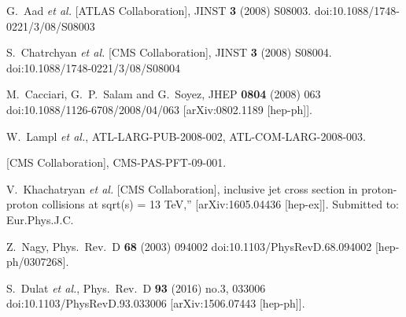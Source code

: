 \documentclass{PoS}
\begin{document}
\begin{thebibliography}{99}

  G.~Aad {\it et al.} [ATLAS Collaboration],
  JINST {\bf 3} (2008) S08003.
  doi:10.1088/1748-0221/3/08/S08003

  S.~Chatrchyan {\it et al.} [CMS Collaboration],
  JINST {\bf 3} (2008) S08004.
  doi:10.1088/1748-0221/3/08/S08004

  M.~Cacciari, G.~P.~Salam and G.~Soyez,
  JHEP {\bf 0804} (2008) 063
  doi:10.1088/1126-6708/2008/04/063
  [arXiv:0802.1189 [hep-ph]].

 W.~Lampl {\it et al.}, %
ATL-LARG-PUB-2008-002, ATL-COM-LARG-2008-003.

  [CMS Collaboration],
  CMS-PAS-PFT-09-001.

 V.~Khachatryan {\it et al.} [CMS Collaboration], %
inclusive jet cross section in proton-proton collisions at sqrt(s) = 13 TeV,'' [arXiv:1605.04436 [hep-ex]]. Submitted
to: Eur.Phys.J.C.

  Z.~Nagy,
  Phys.\ Rev.\ D {\bf 68} (2003) 094002
  doi:10.1103/PhysRevD.68.094002
  [hep-ph/0307268].

  S.~Dulat {\it et al.},
  Phys.\ Rev.\ D {\bf 93} (2016) no.3,  033006
  doi:10.1103/PhysRevD.93.033006
  [arXiv:1506.07443 [hep-ph]].



\end{thebibliography}
\end{document}

